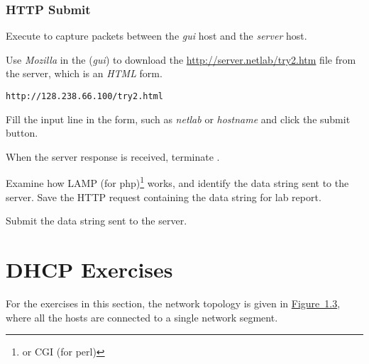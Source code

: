 \documentclass{../UTNetLab}
\begin{document}
\section{HTTP Submit}
Execute  to capture packets between the \textit{gui} host and the \textit{server} host.

Use \textit{Mozilla}  in the (\textit{gui}) to download the \url{http://server.netlab/try2.htm} file  from the server, which is an \textit{HTML} form.

\begin{lstlisting}
http://128.238.66.100/try2.html
\end{lstlisting}

Fill the input line in the form, such as \textit{netlab} or \textit{hostname} and click the submit button.

When the server response is received, terminate .

Examine how LAMP (for php)\footnote{or CGI (for perl)} works, and identify the data string sent to the server.
Save the HTTP request containing the data string for lab report.

\begin{report}
    \item Submit the data string sent to the server.
\end{report}

\part{DHCP Exercises}
For the exercises in this section, the network topology is given in \hyperref[fig:1.3]{Figure~1.3}, where all the hosts are connected to a single network segment.
\end{document}
